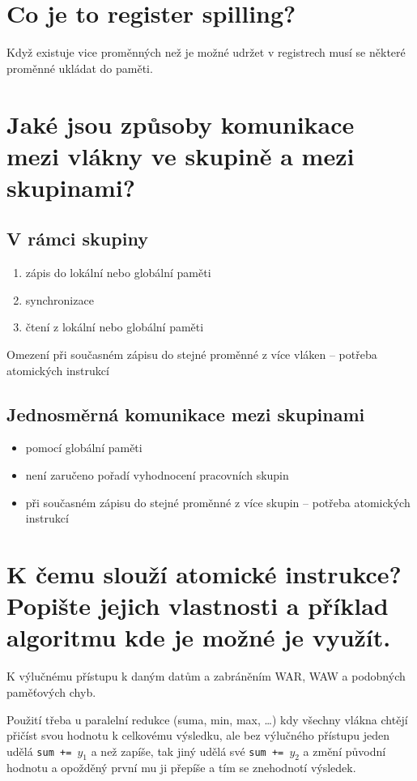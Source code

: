 \section{Co je to register spilling?}
	Když existuje vice proměnných než je možné udržet v registrech musí se některé proměnné ukládat do paměti.


\section{Jaké jsou způsoby komunikace mezi vlákny ve skupině a mezi skupinami?}
	\subsection*{V rámci skupiny}
	\begin{enumerate}
		\setlength\itemsep{0em}
		\item zápis do lokální nebo globální paměti
		\item synchronizace
		\item čtení z lokální nebo globální paměti
	\end{enumerate}
	Omezení při současném zápisu do stejné proměnné z více vláken -- potřeba atomických instrukcí
	
	\subsection*{Jednosměrná komunikace mezi skupinami}
	\begin{itemize}
		\setlength\itemsep{0em}
		\item pomocí globální paměti
		\item není zaručeno pořadí vyhodnocení pracovních skupin
		\item při současném zápisu do stejné proměnné z více skupin -- potřeba atomických instrukcí
	\end{itemize}


\section{K čemu slouží atomické instrukce? Popište jejich vlastnosti a příklad algoritmu kde je možné je využít.}
	\label{sec:atomicke_instrukce}
	K výlučnému přístupu k daným datům a zabráněním WAR, WAW a podobných paměťových chyb. 
	
	Použití třeba u paralelní redukce (suma, min, max, \dots) kdy všechny vlákna chtějí přičíst svou hodnotu k celkovému výsledku, ale bez výlučného přístupu jeden udělá \texttt{sum += $y_1$} a než zapíše, tak jiný udělá své \texttt{sum += $y_2$} a změní původní hodnotu a opožděný první mu ji přepíše a tím se znehodnotí výsledek.
	

